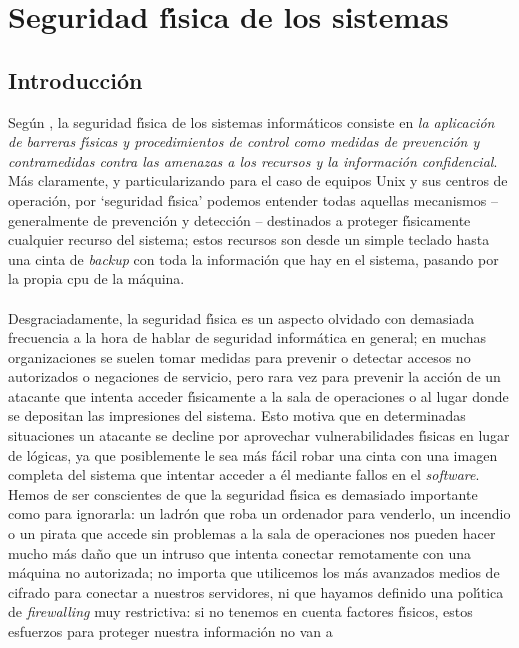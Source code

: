 \chapter{Seguridad f\'{\i}sica de los sistemas}
\section{Introducci\'on}
Seg\'un \cite{kn:glo}, la seguridad f\'{\i}sica de los sistemas inform\'aticos
consiste en {\it la aplicaci\'on de barreras f\'{\i}sicas y procedimientos de
control como medidas de prevenci\'on y contramedidas contra las amenazas a los
recursos y la informaci\'on confidencial}. M\'as claramente, y particularizando
para el caso de equipos Unix y sus centros de operaci\'on, por `seguridad 
f\'{\i}sica' podemos entender todas aquellas mecanismos -- generalmente de
prevenci\'on y detecci\'on -- destinados a proteger f\'{\i}sicamente cualquier
recurso del sistema; estos recursos son desde un simple teclado hasta una 
cinta de {\it backup} con toda la informaci\'on que hay en el sistema, pasando 
por la propia {\sc cpu} de la m\'aquina.\\
\\Desgraciadamente, la seguridad f\'{\i}sica es un aspecto olvidado con 
demasiada frecuencia a la hora de hablar de seguridad inform\'atica en general;
en muchas organizaciones se suelen tomar medidas para prevenir o detectar 
accesos no autorizados o negaciones de servicio, pero rara vez para prevenir
la acci\'on de un atacante que intenta acceder f\'{\i}sicamente a la sala de 
operaciones o al lugar donde se depositan las impresiones del sistema. Esto 
motiva que en determinadas situaciones un atacante se decline por aprovechar
vulnerabilidades f\'{\i}sicas en lugar de l\'ogicas, ya que posiblemente le
sea m\'as f\'acil robar una cinta con una imagen completa del sistema que 
intentar acceder a \'el mediante fallos en el {\it software}. Hemos de ser 
conscientes de que la seguridad f\'{\i}sica es demasiado importante como para
ignorarla: un ladr\'on que roba un ordenador para venderlo, un incendio o un
pirata que accede sin problemas a la sala de operaciones nos pueden hacer mucho
m\'as da\~no que un intruso que intenta conectar remotamente con una m\'aquina
no autorizada; no importa que utilicemos los m\'as avanzados medios de cifrado
para conectar a nuestros servidores, ni que hayamos definido una pol\'{\i}tica
de {\it firewalling} muy restrictiva: si no tenemos en cuenta factores 
f\'{\i}sicos, estos esfuerzos para proteger nuestra informaci\'on no van a 
